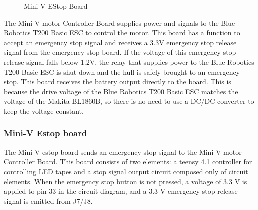\documentclass[lettersize,journal]{IEEEtran}
\begin{document}
\begin{figure}[H]
  \begin{center}
  \end{center}
  \caption{Mini-V EStop Board}
  \label{fig:miniv_motor_controller_board}
\end{figure}

The Mini-V motor Controller Board supplies power and signals to the Blue Robotics T200 Basic ESC to control the motor.
This board has a function to accept an emergency stop signal and receives a 3.3V emergency stop release signal from the emergency stop board.
If the voltage of this emergency stop release signal falls below 1.2V, the relay that supplies power to the Blue Robotics T200 Basic ESC is shut down and the hull is safely brought to an emergency stop.
This board receives the battery output directly to the board.
This is because the drive voltage of the Blue Robotics T200 Basic ESC matches the voltage of the Makita BL1860B, so there is no need to use a DC/DC converter to keep the voltage constant.

\subsubsection{Mini-V Estop board}

The Mini-V estop board sends an emergency stop signal to the Mini-V motor Controller Board.
This board consists of two elements: a teensy 4.1 controller for controlling LED tapes and a stop signal output circuit composed only of circuit elements.
When the emergency stop button is not pressed, a voltage of 3.3 V is applied to pin 33 in the circuit diagram, and a 3.3 V emergency stop release signal is emitted from J7/J8.
\end{document}
